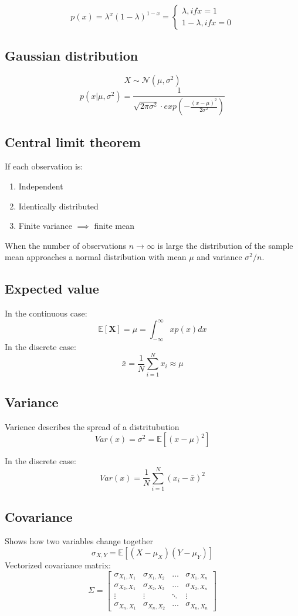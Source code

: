 \documentclass[12pt,a4paper]{article}
\begin{document}
\[
p(x) = \lambda^x(1 - \lambda)^{1 - x} = \begin{cases}
    \lambda, if x = 1 \\
    1 - \lambda, if x = 0
\end{cases}
\]

\subsection{Gaussian distribution}
\[
X \sim \mathcal{N}(\mu, \sigma^2)
\]
\[
p(x | \mu, \sigma^2) = \frac{1}{\sqrt{2 \pi \sigma^2} \cdot exp(-\frac{(x - \mu)^2}{2 \sigma^2})}
\]

\subsection{Central limit theorem}
If each observation is:
\begin{enumerate}
    \item Independent
    \item Identically distributed
    \item Finite variance $\implies$ finite mean
\end{enumerate}
When the number of observations $n \rightarrow \infty$ is large the distribution of the sample mean approaches a normal distribution with mean $\mu$ and variance $\sigma^2/n$.

\subsection{Expected value}
In the continuous case:
\[
\mathbb{E}[\mathbf{X}] = \mu = \int_{-\infty}^{\infty} x p(x) dx
\]
In the discrete case:
\[
\bar{x} = \frac{1}{N} \sum_{i=1}^{N}x_i \approx \mu
\]

\subsection{Variance}
Varience describes the spread of a distritubution   
\[
Var(x) = \sigma^2 = \mathbb{E}[(x - \mu)^2]
\]

In the discrete case:
\[
Var(x) = \frac{1}{N} \sum_{i=1}^{N} (x_i - \bar{x})^2
\]

\subsection{Covariance}
Shows how two variables change together 
\[
\sigma_{X,Y} = \mathbb{E}[(X - \mu_X)(Y - \mu_Y)]
\]
Vectorized covariance matrix:
\[
\Sigma = \begin{bmatrix}
    \sigma_{X_1, X_1} & \sigma_{X_1
, X_2} & \ldots & \sigma_{X_1, X_n} \\
    \sigma_{X_2, X_1} & \sigma_{X_2, X_2} & \ldots & \sigma_{X_2, X_n} \\
    \vdots & \vdots & \ddots & \vdots \\
    \sigma_{X_n, X_1} & \sigma_{X_n, X_2} & \ldots & \sigma_{X_n, X_n}
\end{bmatrix}
\]
\end{document}
